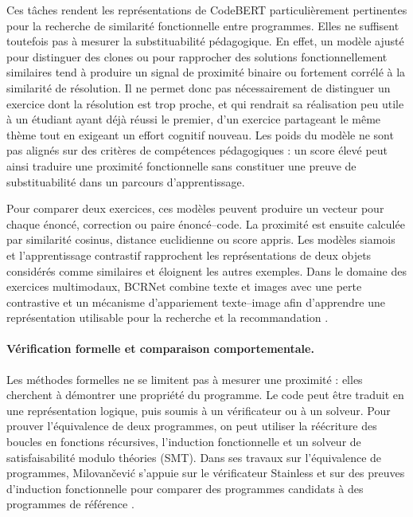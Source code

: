 \documentclass[12pt,a4paper,oneside]{report}
\begin{document}
Ces tâches rendent les représentations de CodeBERT particulièrement
pertinentes pour la recherche de similarité fonctionnelle entre programmes.
Elles ne suffisent toutefois pas à mesurer la substituabilité pédagogique.
En effet, un modèle ajusté pour distinguer des clones ou pour rapprocher des
solutions fonctionnellement similaires tend à produire un signal de
proximité binaire ou fortement corrélé à la similarité de résolution. Il ne
permet donc pas nécessairement de distinguer un exercice dont la résolution
est trop proche, et qui rendrait sa réalisation peu utile à un étudiant ayant
déjà réussi le premier, d'un exercice partageant le même thème tout en
exigeant un effort cognitif nouveau. Les poids du modèle ne sont pas alignés
sur des critères de compétences pédagogiques : un score élevé peut ainsi
traduire une proximité fonctionnelle sans constituer une preuve de
substituabilité dans un parcours d'apprentissage.

Pour comparer deux exercices, ces modèles peuvent produire un vecteur pour
chaque énoncé, correction ou paire énoncé--code. La proximité est ensuite
calculée par similarité cosinus, distance euclidienne ou score appris. Les
modèles siamois et l'apprentissage contrastif rapprochent les représentations
de deux objets considérés comme similaires et éloignent les autres exemples.
Dans le domaine des exercices multimodaux, BCRNet combine texte et images
avec une perte contrastive et un mécanisme d'appariement texte--image afin
d'apprendre une représentation utilisable pour la recherche et la
recommandation \cite{mu_2023}.

\paragraph{Vérification formelle et comparaison comportementale.}

Les méthodes formelles ne se limitent pas à mesurer une proximité : elles
cherchent à démontrer une propriété du programme. Le code peut être traduit
en une représentation logique, puis soumis à un vérificateur ou à un
solveur. Pour prouver l'équivalence de deux programmes, on peut utiliser la
réécriture des boucles en fonctions récursives, l'induction fonctionnelle et
un solveur de satisfaisabilité modulo théories (SMT). Dans ses travaux sur
l'équivalence de programmes, Milovančević s'appuie sur le vérificateur
Stainless et sur des preuves d'induction fonctionnelle pour comparer des
programmes candidats à des programmes de référence
\cite{milovancevic_automated_nodate}.
\end{document}
